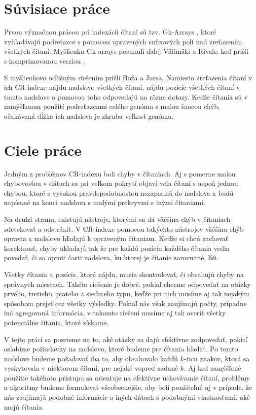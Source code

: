 \section{Súvisiace práce}

Prvou význačnou prácou pri indexácii čítaní sú tzv. Gk-Arrays \cite{gk_arrays}, ktoré
vyhľadávajú podreťazce s pomocou upravených sufixových polí nad zreťazením všetkých
čítaní.
Myšlienku Gk-arrays posunuli ďalej Välimäki a Rivals, keď prišli s komprimovanou
verziou \cite{comp_gk_arrays}.

S myšlienkovo odlišným riešením prišli Boža a Jursa. Namiesto zreťazenia čítaní v
ich CR-indexe \cite{cr_index} nájdu nadslovo všetkých čítaní, nájdu pozícíe všetkých
čítaní v tomto nadslove a pomocou toho odpovedajú na rôzne dotazy. Keďže čítania sú v zamýšľanom použití podreťazcami celého
genómu s malou šancou chýb, očakávaná dĺžka ich nadslova je zhruba veľkosť genómu.

\section{Ciele práce}

Jedným z problémov CR-indexu boli chyby v čítaniach. Aj s pomerne malou chybovosťou
v dátach sa pri veľkom pokrytí objaví veľa čítaní s aspoň jednou chybou, ktoré s vysokou
pravdepodobnosťou nezapadnú do nadslova a budú napísané na konci nadslova s malými
prekryvmi s inými čítaniami.

Na druhú stranu, existujú nástroje, ktorými sa dá väčšina chýb v čítaniach zdetekovať
a odstrániť. V CR-indexe pomocou takýchto nástrojov väčšinu chýb opravia a nadslovo
hľadajú k opraveným čítaniam. Keďže si chcú zachovať korektnosť, chyby ukladajú tak
že pre každú pozíciu každého čítania vedia povedať, či sa oproti časti nadslova,
ku ktorej je čítanie zarovnané, líši.

Všetky čítania a pozície, ktoré nájdu, musia skontrolovať, či obsahujú chyby na správnych miestach.
Takéto riešenie je dobré, pokiaľ chceme odpovedať na otázky prvého, tretieho, piateho a
siedmeho typu, keďže pri nich musíme aj tak nejakým spôsobom prejsť cez všetky výsledky.
Pokiaľ nás však zaujímajú počty, prípadne iná agregovaná informácia, v takomto riešení
musíme aj tak overiť všetky potenciálne čítania, ktoré získame.

V tejto práci sa pozrieme na to, aké otázky sa dajú efektívne zodpovedať, pokiaľ
oslabíme požiadavky na nadslovo, ktoré budeme pre čítania hľadať. Po tomto nadslove
budeme požadovať iba to, aby obsahovalo každú $k$-ticu znakov, ktorá sa vyskytovala
v niektorom čítaní, pre nejaké vopred zadané $k$. Aj keď zamýšľané použitie takéhoto
prístupu sa orientuje na efektívne uchovávanie čítaní, problémy a algoritmy budeme
formulovať všeobecnejšie, aby boli použiteľné aj v prípade, že nás zaujímajú podobné
informácie o iných dátach s podobnými vlastnosťami, aké majú čítania.

